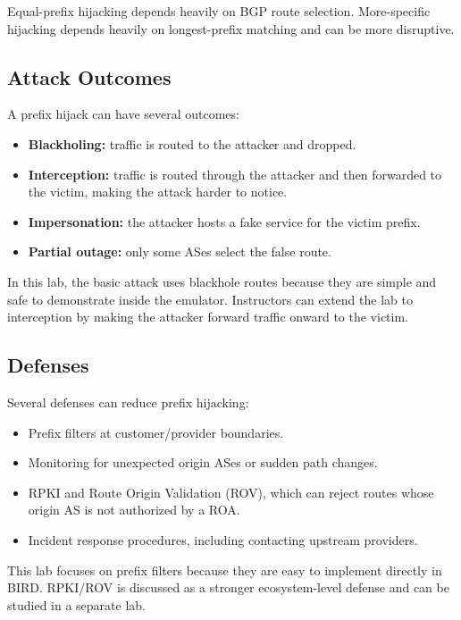 Equal-prefix hijacking depends heavily on BGP route selection. More-specific
hijacking depends heavily on longest-prefix matching and can be more disruptive.

\subsection{Attack Outcomes}

A prefix hijack can have several outcomes:

\begin{itemize}[noitemsep]
\item \textbf{Blackholing:} traffic is routed to the attacker and dropped.
\item \textbf{Interception:} traffic is routed through the attacker and then
      forwarded to the victim, making the attack harder to notice.
\item \textbf{Impersonation:} the attacker hosts a fake service for the victim
      prefix.
\item \textbf{Partial outage:} only some ASes select the false route.
\end{itemize}

In this lab, the basic attack uses blackhole routes because they are simple and
safe to demonstrate inside the emulator. Instructors can extend the lab to
interception by making the attacker forward traffic onward to the victim.

\subsection{Defenses}

Several defenses can reduce prefix hijacking:

\begin{itemize}[noitemsep]
\item Prefix filters at customer/provider boundaries.
\item Monitoring for unexpected origin ASes or sudden path changes.
\item RPKI and Route Origin Validation (ROV), which can reject routes whose
      origin AS is not authorized by a ROA.
\item Incident response procedures, including contacting upstream providers.
\end{itemize}

This lab focuses on prefix filters because they are easy to implement directly
in BIRD. RPKI/ROV is discussed as a stronger ecosystem-level defense and can be
studied in a separate lab.


